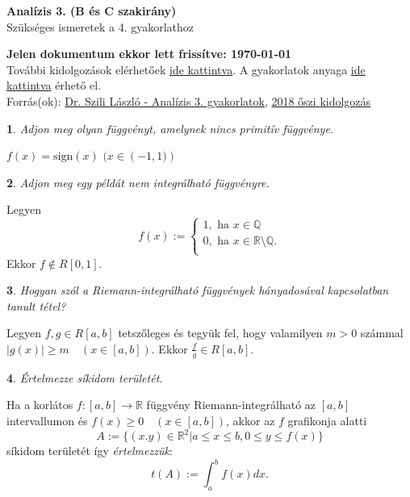 \documentclass[a4paper]{article}
\def\Q{\mathbb{Q}}
\def\R{\mathbb{R}}
\theoremstyle{qstyle}
\newtheorem{question}{}{}
\begin{document}
	\begin{center}
		{\Large\textbf{Analízis 3. (B és C szakirány)}}\\
		{\Large Szükséges ismeretek a 4. gyakorlathoz}
	\end{center}
	
	\begin{framed}
		\textbf{Jelen dokumentum ekkor lett frissítve: {\yyyymmdddate\today} \ \currenttime}\\
		További kidolgozások elérhetőek \href{https://people.inf.elte.hu/totadavid95/Analizis3/2019-tavasz/}{ide kattintva}. A gyakorlatok anyaga \href{http://numanal.inf.elte.hu/~szili/Oktatas/An3_BC_szakirany_2019/An3_BC_gyak_2019_tavasz.pdf}{ide kattintva} érhető el.\\	
		Forrás(ok): \href{http://numanal.inf.elte.hu/~szili/Oktatas/An3_BC_szakirany_2019/An3_BC_gyak_2019_tavasz.pdf}{Dr. Szili László - Analízis 3. gyakorlatok}, \href{https://people.inf.elte.hu/totadavid95/Analizis3/Anal3_def.pdf}{2018 őszi kidolgozás}
	\end{framed}

	\begin{question}
		Adjon meg olyan függvényt, amelynek \emph{nincs} primitív függvénye.
	\end{question}
	$f(x)=\mathrm{sign}(x)$   \quad  $(x \in \left(-1,1)\right)$
	
	\begin{question}
		Adjon meg egy példát \emph{nem integrálható} függvényre. 
	\end{question}
	Legyen
	$$
	f(x) := 
	\begin{cases}
	1, \text{ ha } x \in \Q \\
	0, \text{ ha } x \in \R \setminus \Q \text{.} \\
	\end{cases}
	$$
	Ekkor $f \notin R[0,1]$.
	
	\begin{question}
		Hogyan szól a Riemann-integrálható függvények hányadosával kapcsolatban tanult tétel?
	\end{question}
	Legyen $f, g \in R[a,b]$ tetszőleges és tegyük fel, hogy valamilyen $m > 0$ számmal $|g(x)| \ge m \quad (x \in [a,b])$. Ekkor $\frac{f}{g} \in R[a,b]$.
	
	\begin{question}
		Értelmezze síkidom területét.
	\end{question}
	Ha a korlátos $f : [a,b] \to \R$ függvény Riemann-integrálható az $[a,b]$ intervallumon és $f(x)\ge 0 \quad (x\in [a,b])$, akkor az $f$ grafikonja alatti
	$$A:= \{(x.y)\in\R^2 | a \le x \le b, 0\le y \le f(x)\}$$
	síkidom területét így \textit{értelmezzük}:
	$$t(A) := \int_{a}^{b} f(x)dx \text{.}$$
\end{document}
